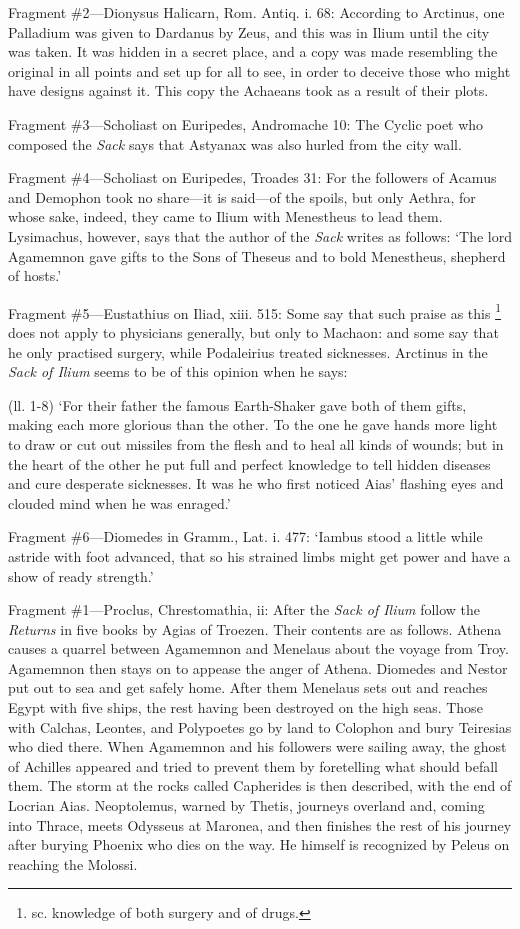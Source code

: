 Fragment \#2—Dionysus Halicarn, Rom. Antiq. i. 68: According to Arctinus,
one Palladium was given to Dardanus by Zeus, and this was in Ilium until the
city was taken. It was hidden in a secret place, and a copy was made resembling
the original in all points and set up for all to see, in order to deceive those
who might have designs against it. This copy the Achaeans took as a result of
their plots.

Fragment \#3—Scholiast on Euripedes, Andromache 10: The Cyclic poet who
composed the \emph{Sack} says that Astyanax was also hurled from the
city wall.

Fragment \#4—Scholiast on Euripedes, Troades 31: For the followers of
Acamus and Demophon took no share—it is said—of the spoils, but
only Aethra, for whose sake, indeed, they came to Ilium with Menestheus to lead
them. Lysimachus, however, says that the author of the \emph{Sack}
writes as follows: ‘The lord Agamemnon gave gifts to the Sons of Theseus
and to bold Menestheus, shepherd of hosts.’

Fragment \#5—Eustathius on Iliad, xiii. 515: Some say that such praise as
this \footnote{sc. knowledge of both
surgery and of drugs.} does not apply to physicians
generally, but only to Machaon: and some say that he only practised surgery,
while Podaleirius treated sicknesses. Arctinus in the \emph{Sack of
Ilium} seems to be of this opinion when he says:

(ll. 1-8) ‘For their father the famous Earth-Shaker gave both of them
gifts, making each more glorious than the other. To the one he gave hands more
light to draw or cut out missiles from the flesh and to heal all kinds of
wounds; but in the heart of the other he put full and perfect knowledge to tell
hidden diseases and cure desperate sicknesses. It was he who first noticed
Aias’ flashing eyes and clouded mind when he was enraged.’

Fragment \#6—Diomedes in Gramm., Lat. i. 477: ‘Iambus stood a little
while astride with foot advanced, that so his strained limbs might get power
and have a show of ready strength.’


Fragment \#1—Proclus, Chrestomathia, ii: After the \emph{Sack of
Ilium} follow the \emph{Returns} in five books by Agias of Troezen.
Their contents are as follows. Athena causes a quarrel between Agamemnon and
Menelaus about the voyage from Troy. Agamemnon then stays on to appease the
anger of Athena. Diomedes and Nestor put out to sea and get safely home. After
them Menelaus sets out and reaches Egypt with five ships, the rest having been
destroyed on the high seas. Those with Calchas, Leontes, and Polypoetes go by
land to Colophon and bury Teiresias who died there. When Agamemnon and his
followers were sailing away, the ghost of Achilles appeared and tried to
prevent them by foretelling what should befall them. The storm at the rocks
called Capherides is then described, with the end of Locrian Aias. Neoptolemus,
warned by Thetis, journeys overland and, coming into Thrace, meets Odysseus at
Maronea, and then finishes the rest of his journey after burying Phoenix who
dies on the way. He himself is recognized by Peleus on reaching the Molossi.

